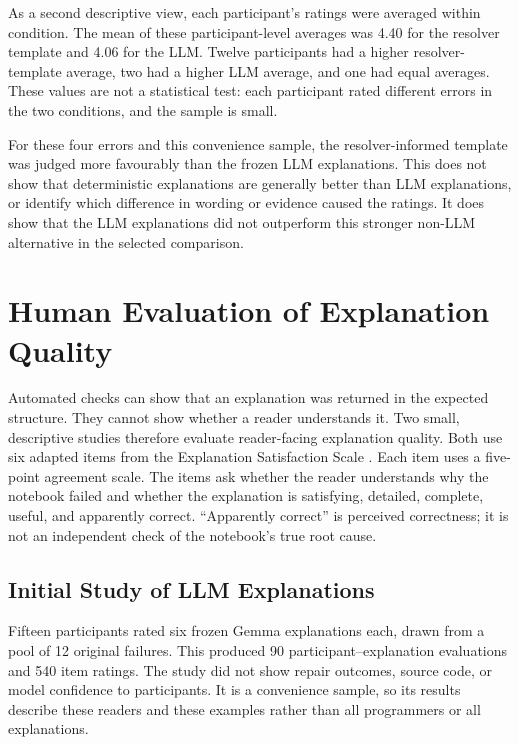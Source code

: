 As a second descriptive view, each participant's ratings were averaged within
condition. The mean of these participant-level averages was 4.40 for the
resolver template and 4.06 for the LLM. Twelve participants had a higher
resolver-template average, two had a higher LLM average, and one had equal
averages. These values are not a statistical test: each participant rated
different errors in the two conditions, and the sample is small.

For these four errors and this convenience sample, the resolver-informed
template was judged more favourably than the frozen LLM explanations. This does
not show that deterministic explanations are generally better than LLM
explanations, or identify which difference in wording or evidence caused the
ratings. It does show that the LLM explanations did not outperform this stronger
non-LLM alternative in the selected comparison.

\fi

\section{Human Evaluation of Explanation Quality}
\label{sec:v-human-eval-current}
\label{sec:v-human-eval}

Automated checks can show that an explanation was returned in the expected
structure. They cannot show whether a reader understands it. Two small,
descriptive studies therefore evaluate reader-facing explanation quality. Both
use six adapted items from the Explanation Satisfaction Scale
\cite{hoffman2023measures}. Each item uses a five-point agreement scale. The
items ask whether the reader understands why the notebook failed and whether
the explanation is satisfying, detailed, complete, useful, and apparently
correct. ``Apparently correct'' is perceived correctness; it is not an
independent check of the notebook's true root cause.

\subsection{Initial Study of LLM Explanations}
\label{sec:v-human-eval-instrument}

Fifteen participants rated six frozen Gemma explanations each, drawn from a
pool of 12 original failures. This produced 90 participant--explanation
evaluations and 540 item ratings. The study did not show repair outcomes,
source code, or model confidence to participants. It is a convenience sample,
so its results describe these readers and these examples rather than all
programmers or all explanations.

